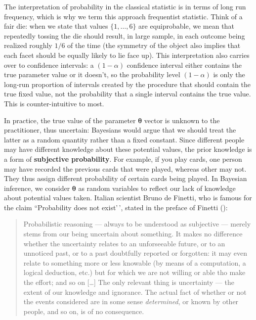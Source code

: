 \documentclass[
  11pt,
  letterpaper,
]{scrbook}
\theoremstyle{definition}
\theoremstyle{plain}
\theoremstyle{plain}
\theoremstyle{definition}
\theoremstyle{definition}
\theoremstyle{remark}
\begin{document}
The interpretation of probability in the classical statistic is in terms
of long run frequency, which is why we term this approach frequentist
statistic. Think of a fair die: when we state that values
\(\{1, \ldots, 6\}\) are equiprobable, we mean that repeatedly tossing
the die should result, in large sample, in each outcome being realized
roughly \(1/6\) of the time (the symmetry of the object also implies
that each facet should be equally likely to lie face up). This
interpretation also carries over to confidence intervals: a
\((1-\alpha)\) confidence interval either contains the true parameter
value or it doesn't, so the probability level \((1-\alpha)\) is only the
long-run proportion of intervals created by the procedure that should
contain the true fixed value, not the probability that a single interval
contains the true value. This is counter-intuitive to most.

In practice, the true value of the parameter \(\boldsymbol{\theta}\)
vector is unknown to the practitioner, thus uncertain: Bayesians would
argue that we should treat the latter as a random quantity rather than a
fixed constant. Since different people may have different knowledge
about these potential values, the prior knowledge is a form of
\textbf{subjective probability}. For example, if you play cards, one
person may have recorded the previous cards that were played, whereas
other may not. They thus assign different probability of certain cards
being played. In Bayesian inference, we consider \(\boldsymbol{\theta}\)
as random variables to reflect our lack of knowledge about potential
values taken. Italian scientist Bruno de Finetti, who is famous for the
claim ``Probability does not exist'\,', stated in the preface of Finetti
():

\begin{quote}
Probabilistic reasoning --- always to be understood as subjective ---
merely stems from our being uncertain about something. It makes no
difference whether the uncertainty relates to an unforseeable future, or
to an unnoticed past, or to a past doubtfully reported or forgotten: it
may even relate to something more or less knowable (by means of a
computation, a logical deduction, etc.) but for which we are not willing
or able tho make the effort; and so on {[}\ldots{]} The only relevant
thing is uncertainty --- the extent of our knowledge and ignorance. The
actual fact of whether or not the events considered are in some sense
\emph{determined}, or known by other people, and so on, is of no
consequence.
\end{quote}
\end{document}

